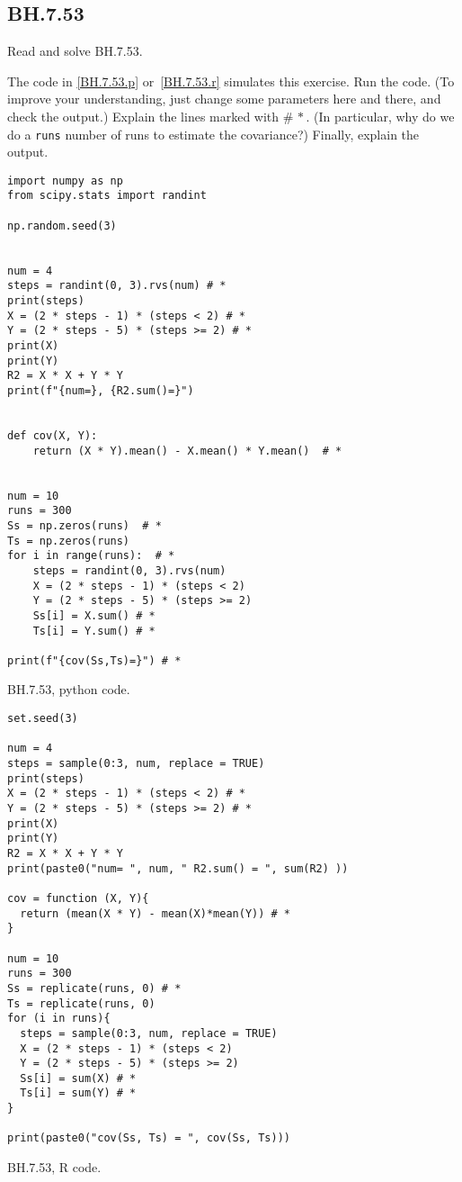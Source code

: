 

\subsection{BH.7.53}
\label{sec:bh.53}

\begin{exercise}
Read and solve BH.7.53.
\end{exercise}


\begin{exercise}
The code in \cref{BH.7.53.p} or~\cref{BH.7.53.r} simulates this exercise.
Run the code. (To improve your understanding, just change some parameters here and there, and check the output.) Explain the lines marked with $\# \, *$. (In particular, why do we do a \verb|runs| number of runs to estimate the covariance?) Finally, explain the output.
\end{exercise}

\begin{listing}[!ht]
\begin{verbatim}
import numpy as np
from scipy.stats import randint

np.random.seed(3)


num = 4
steps = randint(0, 3).rvs(num) # *
print(steps)
X = (2 * steps - 1) * (steps < 2) # *
Y = (2 * steps - 5) * (steps >= 2) # *
print(X)
print(Y)
R2 = X * X + Y * Y
print(f"{num=}, {R2.sum()=}")


def cov(X, Y):
    return (X * Y).mean() - X.mean() * Y.mean()  # *


num = 10
runs = 300
Ss = np.zeros(runs)  # *
Ts = np.zeros(runs)
for i in range(runs):  # *
    steps = randint(0, 3).rvs(num)
    X = (2 * steps - 1) * (steps < 2)
    Y = (2 * steps - 5) * (steps >= 2)
    Ss[i] = X.sum() # *
    Ts[i] = Y.sum() # *

print(f"{cov(Ss,Ts)=}") # *
\end{verbatim}
\caption{BH.7.53, python code.}
\label{BH.7.53.p}


\end{listing}

\begin{listing}[!ht]
\begin{verbatim}
set.seed(3)

num = 4
steps = sample(0:3, num, replace = TRUE)
print(steps)
X = (2 * steps - 1) * (steps < 2) # *
Y = (2 * steps - 5) * (steps >= 2) # *
print(X)
print(Y)
R2 = X * X + Y * Y
print(paste0("num= ", num, " R2.sum() = ", sum(R2) ))

cov = function (X, Y){
  return (mean(X * Y) - mean(X)*mean(Y)) # *
}

num = 10
runs = 300
Ss = replicate(runs, 0) # *
Ts = replicate(runs, 0)
for (i in runs){
  steps = sample(0:3, num, replace = TRUE)
  X = (2 * steps - 1) * (steps < 2)
  Y = (2 * steps - 5) * (steps >= 2)
  Ss[i] = sum(X) # *
  Ts[i] = sum(Y) # *
}

print(paste0("cov(Ss, Ts) = ", cov(Ss, Ts)))
\end{verbatim}
\caption{BH.7.53, R code.}
\label{BH.7.53.r}
\end{listing}

